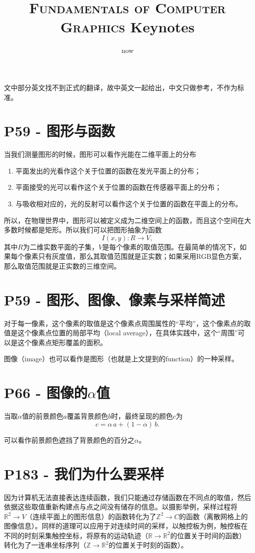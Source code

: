 \documentclass{ctexart}
\title{\textsc{Fundamentals of Computer Graphics} Keynotes}
\author{}
\date{now}
\begin{document}
    \maketitle

	文中部分英文找不到正式的翻译，故中英文一起给出，中文只做参考，不作为标准。

	\section{P59 - 图形与函数}
	当我们测量图形的时候，图形可以看作光能在二维平面上的分布
	\begin{enumerate}
		\item 平面发出的光看作这个关于位置的函数在发光平面上的分布；
		\item 平面接受的光可以看作这个关于位置的函数在传感器平面上的分布；
		\item 与吸收相对应的，光的反射可以看作这个关于位置的函数在平面上的分布。
	\end{enumerate}

	所以，在物理世界中，图形可以被定义成为二维空间上的函数，而且这个空间在大多数时候都是矩形。所以我们可以把图形抽象为函数
	$$
	I(x,y):R\to V,
	$$
	其中$R$为二维实数平面的子集，$V$是每个像素的取值范围。在最简单的情况下，如果每个像素只有灰度值，那么其取值范围就是正实数；如果采用RGB显色方案，那么取值范围就是正实数的三维空间。


	\section{P59 - 图形、图像、像素与采样简述}
	对于每一像素，这个像素的取值是这个像素点周围属性的“平均”，这个像素点的取值是这个像素点位置的局部平均（local average），在具体实践中，这个“周围”可以是这个像素点矩形覆盖的面积。
	
	图像（image）也可以看作是图形（也就是上文提到的function）的一种采样。


	\section{P66 - 图像的$\alpha$值}
	当取$\alpha$值的前景颜色$a$覆盖背景颜色$b$时，最终呈现的颜色$c$为
	$$
	c=\alpha\, a+(1-\alpha)\, b.
	$$
	
	可以看作前景颜色遮挡了背景颜色的百分之$\alpha$。

	
	\section{P183 - 我们为什么要采样}
	因为计算机无法直接表达连续函数，我们只能通过存储函数在不同点的取值，然后依据这些取值重新构建点与点之间没有储存的信息。以摄影举例，采样过程将$\mathbb R^2\to V$（连续平面上的图形信息）的函数转化为了$\mathbb Z^2\to C$的函数（离散网格上的图像信息）。同样的道理可以应用于对连续时间的采样，以触控板为例，触控板在不同的时刻采集触控坐标，将原有的运动轨迹（$\mathbb R\to\mathbb R^2$的位置关于时间的函数）转化为了一连串坐标序列（$\mathbb Z\to\mathbb R^2$的位置关于时刻的函数）。
\end{document}
